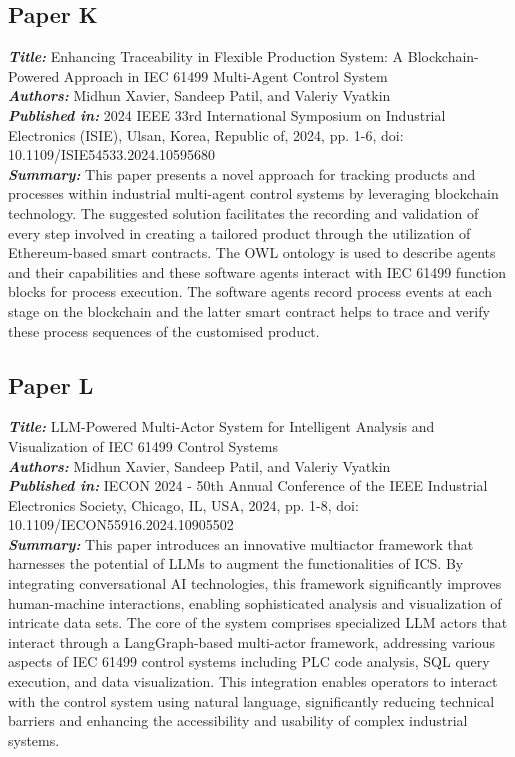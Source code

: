 \subsection{Paper K}
\textbf{\textit{Title:}} Enhancing Traceability in Flexible Production System: A Blockchain-Powered Approach in IEC 61499 Multi-Agent Control System\\
\textbf{\textit{Authors:}} Midhun Xavier, Sandeep Patil, and Valeriy Vyatkin\\
\textbf{\textit{Published in:}} 2024 IEEE 33rd International Symposium on Industrial Electronics (ISIE), Ulsan, Korea, Republic of, 2024, pp. 1-6, doi: 10.1109/ISIE54533.2024.10595680\\
\textbf{\textit{Summary:}} This paper presents a novel approach for tracking products and processes within industrial multi-agent control systems by leveraging blockchain technology. The suggested solution facilitates the recording and validation of every step involved in creating a tailored product through the utilization of Ethereum-based smart contracts. The OWL ontology is used to describe agents and their capabilities and these software agents interact with IEC 61499 function blocks for process execution. The software agents record process events at each stage on the blockchain and the latter smart contract helps to trace and verify these process sequences of the customised product.\\

\subsection{Paper L}
\textbf{\textit{Title:}} LLM-Powered Multi-Actor System for Intelligent Analysis and Visualization of IEC 61499 Control Systems\\
\textbf{\textit{Authors:}} Midhun Xavier, Sandeep Patil, and Valeriy Vyatkin\\
\textbf{\textit{Published in:}} IECON 2024 - 50th Annual Conference of the IEEE Industrial Electronics Society, Chicago, IL, USA, 2024, pp. 1-8, doi: 10.1109/IECON55916.2024.10905502\\
\textbf{\textit{Summary:}} This paper introduces an innovative multiactor framework that harnesses the potential of LLMs to augment the functionalities of ICS. By integrating conversational AI technologies, this framework significantly improves human-machine interactions, enabling sophisticated analysis and visualization of intricate data sets. The core of the system comprises specialized LLM actors that interact through a LangGraph-based multi-actor framework, addressing various aspects of IEC 61499 control systems including PLC code analysis, SQL query execution, and data visualization. This integration enables operators to interact with the control system using natural language, significantly reducing technical barriers and enhancing the accessibility and usability of complex industrial systems.\\


